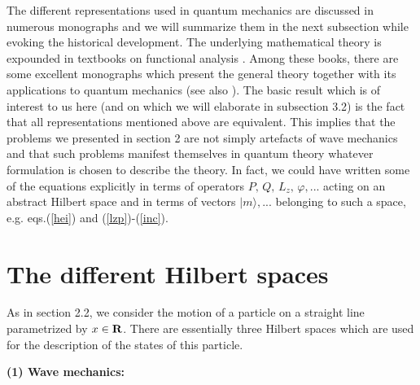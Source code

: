\documentclass[12pt]{report}
\begin{document}
 The different representations used in quantum mechanics are
 discussed in numerous monographs \cite{ct} and we will 
 summarize them in the next subsection 
while evoking the historical  development. 
 The underlying mathematical theory is expounded in textbooks
 on functional analysis  \cite{af}. Among these books, there are some
 excellent monographs which present the general theory together with its
 applications to quantum mechanics
 \cite{rs,sg,bgc} (see also \cite{ri,lio,tj,krey}).
The basic result which is of interest to us here
(and on which we will elaborate in subsection 3.2)
is the fact that all representations mentioned above 
are equivalent. 
This implies that the problems we presented 
in section 2 are not simply artefacts of wave mechanics
and that such problems manifest themselves 
 in quantum theory  
whatever formulation is chosen to describe the theory. 
In fact, we could have written some of the 
equations  explicitly in terms of operators 
$P, \, Q, \, L_z, \, \varphi , ...$
acting  on an abstract Hilbert space and 
in terms of vectors 
$| m \rangle ,...$ belonging to such a space, e.g. eqs.(\ref{hei})
and  (\ref{lzp})-(\ref{inc}). 


   
   \section{The different Hilbert spaces}

As in section 2.2, we consider the motion of a particle 
on a straight line parametrized by 
$x \in {\bf R}$. 
There are essentially three Hilbert spaces which
are used for the description of the states  of this 
particle.
 
\bigskip
 
\noindent
{\bf (1) Wave mechanics:} 

\medskip 
\end{document}
